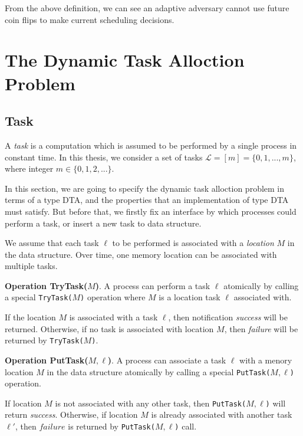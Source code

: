From the above definition, we can see an adaptive adversary cannot use
future coin flips to make current scheduling decisions.

\section{The Dynamic Task Alloction Problem}

\subsection{Task}

A \emph{task} is a computation which is assumed to be performed by a single process in constant time\cite{georgiou2007all}.
In this thesis, we consider a set of tasks $\mathcal{L} = [m] = \{0, 1, ..., m\}$, where integer $m \in \{0, 1, 2, ...\}$.

In this section, we are going to specify the dynamic task alloction problem in terms of a type DTA, and the properties
that an implementation of type DTA must satisfy. But before that, we firstly fix an interface by which processes could
perform a task, or insert a new task to data structure.

We assume that each task $\ell$ to be performed is associated with a \emph{location} $M$
in the data structure. Over time, one memory location can be associated with multiple tasks.

\textbf{Operation TryTask($M$)}.
A process can perform a task $\ell$ atomically by calling a special
\texttt{TryTask(}$M$\texttt{)} operation where $M$ is a location task $\ell$
associated with.

If the location $M$ is associated with a task $\ell$, then notification \emph{success} will be returned.
Otherwise, if no task is associated with location $M$, then \emph{failure} will be returned by \texttt{TryTask(}$M$\texttt{)}.


\textbf{Operation PutTask($M,\ell$)}.
A process can associate a task $\ell$ with a menory location $M$ in the data structure
atomically by calling a special \texttt{PutTask(}$M,\ell$\texttt{)} operation.

If location $M$ is not associated with any other task, then \texttt{PutTask(}$M,\ell$\texttt{)} will return \emph{success}.
Otherwise, if location $M$ is already associated with another task $\ell'$, then $failure$ is returned
by \texttt{PutTask(}$M,\ell$\texttt{)} call.

